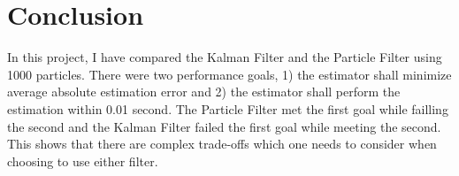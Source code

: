 \section{Conclusion} \label{sec:conclusion}

In this project, I have compared the Kalman Filter and the Particle
Filter using 1000 particles. There were two performance goals, 1)
the estimator shall minimize average absolute estimation error and 2)
the estimator shall perform the estimation within 0.01 second. The
Particle Filter met the first goal while failling the second and the
Kalman Filter failed the first goal while meeting the second. This
shows that there are complex trade-offs which one needs to consider
when choosing to use either filter.
